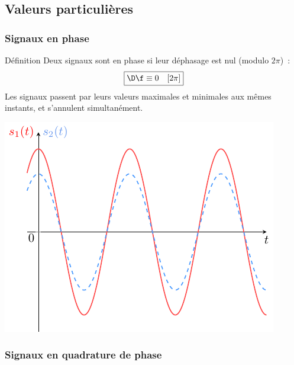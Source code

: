 \documentclass[../main/main.tex]{subfiles}
\begin{document}
\vspace{-20pt}
\subsection{Valeurs particulières}
\subsubsection{Signaux en phase}
\vspace{-20pt}
\begin{minipage}{0.70\linewidth}
    \begin{rdefi}{\small Définition}
        Deux signaux sont en phase si leur déphasage est nul (modulo $2\pi$)~:
        \[\boxed{\D\f \equiv 0\quad[2\pi]}\]
        Les signaux passent par leurs valeurs maximales et minimales aux mêmes
        instants, et s'annulent simultanément.
    \end{rdefi}
\end{minipage}
\hfill
\begin{minipage}{0.30\linewidth}
    \begin{center}
        \includegraphics[width=\linewidth]{dfeq0.pdf}
    \end{center}
\end{minipage}

\vspace{-20pt}
\subsubsection{Signaux en quadrature de phase}
\end{document}
